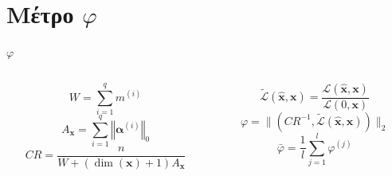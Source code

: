 \documentclass{beamer}
\begin{document}
\section{Μέτρο $\varphi$}
\begin{frame}[c]{$\varphi$}
	\begin{columns}
		\begin{column}{0.5\textwidth}
			\begin{equation*}
				W = \sum\limits_{i=1}^q m^{(i)}
			\end{equation*}
			\begin{equation*}
				A_{\bm{x}} = \sum\limits_{i=1}^q \left\Vert\bm{\alpha}^{(i)}\right\Vert_0
			\end{equation*}
			\begin{equation*}
				CR = \frac{n}{W + (\dim(\bm{x}) + 1)A_{\bm{x}}}
			\end{equation*}
		\end{column}
		\begin{column}{0.5\textwidth}
			\begin{equation*}
				\tilde{\mathcal{L}}(\hat{\bm{x}},\bm{x}) = \frac{\mathcal{L}(\hat{\bm{x}},\bm{x})}{\mathcal{L}(0,\bm{x})}
			\end{equation*}
			\begin{equation*}
				\varphi = \lVert\left(CR^{-1}, \tilde{\mathcal{L}}(\hat{\bm{x}},\bm{x})\right)\rVert_2
			\end{equation*}
			\begin{equation*}
				\bar\varphi = \frac{1}{l}\sum\limits_{j=1}^l \varphi^{(j)}
			\end{equation*}
		\end{column}
	\end{columns}
\end{frame}
\end{document}
